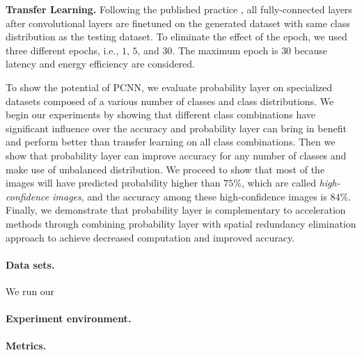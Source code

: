 \documentclass[pageno]{jpaper}
\begin{document}
\textbf{Transfer Learning.} Following the published practice \cite{doersch2015unsupervised, han2016mcdnn, oquab2014learning, shen2016fast, yosinski2014transferable}, all fully-connected layers after convolutional layers are finetuned on the generated dataset with same class distribution as the testing dataset. To eliminate the effect of the epoch, we used three different epochs, i.e., $1$, $5$, and $30$. The maximum epoch is $30$ because latency and energy efficiency are considered.

To show the potential of PCNN, we evaluate probability layer on specialized datasets composed of a various number of classes and class distributions. We begin our experiments by showing that different class combinations have significant influence over the accuracy and probability layer can bring in benefit and perform better than transfer learning on all class combinations. Then we show that probability layer can improve accuracy for any number of classes and make use of unbalanced distribution. We proceed to show that most of the images will have predicted probability higher than $75\%$, which are called \textit{high-confidence images}, and the accuracy among these high-confidence images is $84\%$. Finally, we demonstrate that probability layer is complementary to acceleration methods through combining probability layer with spatial redundancy elimination approach \cite{figurnov2016perforatedcnns} to achieve decreased computation and improved accuracy.

\paragraph{Data sets.} We run our 
\paragraph{Experiment environment.}
\paragraph{Metrics.}
\end{document}

